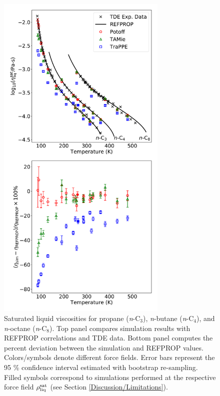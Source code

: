 \documentclass[preprint,review,12pt]{elsarticle}
\begin{document}
	
	\begin{figure}[htb!]
		\centering
		\includegraphics[width=3.2in]{compare_force_fields_short_normal.pdf}
		\caption{Saturated liquid viscosities for propane (\textit{n}-C$_{3}$), \textit{n}-butane (\textit{n}-C$_{4}$), and \textit{n}-octane (\textit{n}-C$_{8}$). Top panel compares simulation results with REFPROP correlations and TDE data. Bottom panel computes the percent deviation between the simulation and REFPROP values. Colors/symbols denote different force fields. Error bars represent the 95 \% confidence interval estimated with bootstrap re-sampling. Filled symbols correspond to simulations performed at the respective force field $\rho_{\rm liq}^{\rm sat}$ (see Section \ref{Discussion/Limitations}).}
		\label{fig:Saturation_C3_C4_C8}
	\end{figure} 
	
\end{document}
